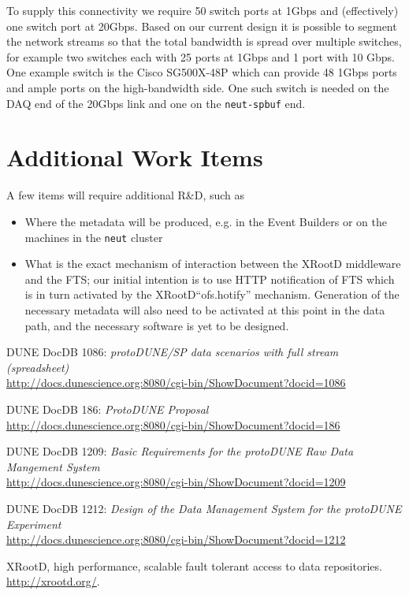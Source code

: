 \documentclass[pdftex,12pt,letter]{article}
\newcommand{\xrd}{XRootD\xspace}
\begin{document}
To supply this connectivity we require 50 switch ports at 1Gbps and
(effectively) one switch port at 20Gbps.  Based on our current design
it is possible to segment the network streams so that the total
bandwidth is spread over multiple switches, for example two switches
each with 25 ports at 1Gbps and 1 port with 10 Gbps.  One example
switch is the Cisco SG500X-48P which can provide 48 1Gbps ports and
ample ports on the high-bandwidth side.  One such switch is needed on
the DAQ end of the 20Gbps link and one on the \texttt{neut-spbuf} end.

\section{Additional Work Items}
A few items will require additional R\&D, such as
\begin{itemize}
\item Where the metadata will be produced, e.g. in the Event Builders or on the machines
in the \texttt{neut} cluster
\item What is the exact mechanism of interaction between the \xrd middleware and the FTS; our initial intention
is to use HTTP notification of FTS which is in turn activated by the \xrd ``ofs.hotify'' mechanism. Generation
of the necessary metadata will also need to be activated at this point in the data path, and the necessary software
is yet to be designed.
\end{itemize}



\begin{thebibliography}{1}
{DUNE DocDB 1086: \textit{ protoDUNE/SP data scenarios with full stream (spreadsheet)}}\\
\url{http://docs.dunescience.org:8080/cgi-bin/ShowDocument?docid=1086}

{DUNE DocDB 186: \textit{ ProtoDUNE Proposal}}\\
\url{http://docs.dunescience.org:8080/cgi-bin/ShowDocument?docid=186}


{DUNE DocDB 1209: \textit{Basic Requirements for the protoDUNE Raw Data Mangement System}}\\
\url{http://docs.dunescience.org:8080/cgi-bin/ShowDocument?docid=1209}


{DUNE DocDB 1212: \textit{Design of the Data Management System for the protoDUNE Experiment}}\\
\url{http://docs.dunescience.org:8080/cgi-bin/ShowDocument?docid=1212}



{XRootD, high performance, scalable fault tolerant access to data  repositories}.\\
  \url{http://xrootd.org/}.

\end{thebibliography}
\end{document}
